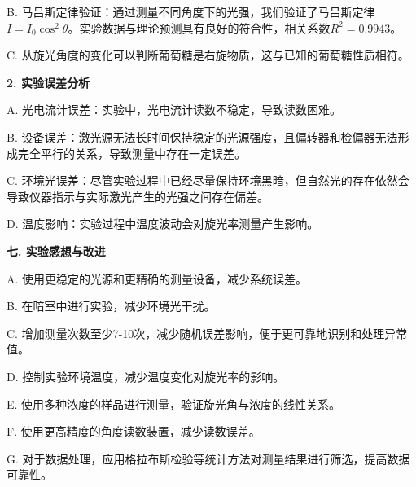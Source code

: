 ﻿\documentclass[12pt,a4paper]{article}
\begin{document}
B. 马吕斯定律验证：通过测量不同角度下的光强，我们验证了马吕斯定律$I = I_0\cos^2\theta$。实验数据与理论预测具有良好的符合性，相关系数$R^2 = 0.9943$。

C. 从旋光角度的变化可以判断葡萄糖是右旋物质，这与已知的葡萄糖性质相符。

\textbf{2. 实验误差分析}

A. 光电流计误差：实验中，光电流计读数不稳定，导致读数困难。

B. 设备误差：激光源无法长时间保持稳定的光源强度，且偏转器和检偏器无法形成完全平行的关系，导致测量中存在一定误差。

C. 环境光误差：尽管实验过程中已经尽量保持环境黑暗，但自然光的存在依然会导致仪器指示与实际激光产生的光强之间存在偏差。

D. 温度影响：实验过程中温度波动会对旋光率测量产生影响。

\textbf{七. 实验感想与改进}

A. 使用更稳定的光源和更精确的测量设备，减少系统误差。

B. 在暗室中进行实验，减少环境光干扰。

C. 增加测量次数至少7-10次，减少随机误差影响，便于更可靠地识别和处理异常值。

D. 控制实验环境温度，减少温度变化对旋光率的影响。

E. 使用多种浓度的样品进行测量，验证旋光角与浓度的线性关系。

F. 使用更高精度的角度读数装置，减少读数误差。

G. 对于数据处理，应用格拉布斯检验等统计方法对测量结果进行筛选，提高数据可靠性。
\end{document}
